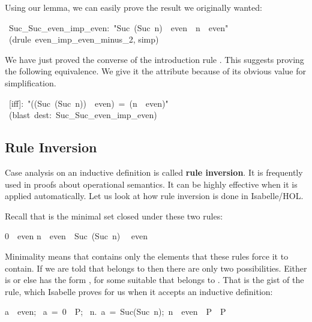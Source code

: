 \medskip
Using our lemma, we can easily prove the result we originally wanted:
\begin{isabelle}
\ Suc_Suc_even_imp_even:\ "Suc\ (Suc\ n)\ \isasymin \ even\ \isasymLongrightarrow \ n\ \isasymin \ even"\isanewline
{}\ (drule\ even_imp_even_minus_2, simp)
\end{isabelle}

We have just proved the converse of the introduction rule . 
This suggests proving the following equivalence.  We give it the
 attribute because of its obvious value for simplification.
\begin{isabelle}
\ [iff]:\ "((Suc\ (Suc\ n))\ \isasymin \ even)\ =\ (n\
\isasymin \ even)"\isanewline
{}\ (blast\ dest:\ Suc_Suc_even_imp_even)
\end{isabelle}


\subsection{Rule Inversion}\label{sec:rule-inversion}

%
Case analysis on an inductive definition is called \textbf{rule
inversion}.  It is frequently used in proofs about operational
semantics.  It can be highly effective when it is applied
automatically.  Let us look at how rule inversion is done in
Isabelle/HOL\@.

Recall that  is the minimal set closed under these two rules:
\begin{isabelle}
0\ \isasymin \ even\isanewline
n\ \isasymin \ even\ \isasymLongrightarrow \ Suc\ (Suc\ n)\ \isasymin
\ even
\end{isabelle}
Minimality means that  contains only the elements that these
rules force it to contain.  If we are told that 
belongs to
 then there are only two possibilities.  Either  is 
or else \isa{a} has the form \isa{Suc(Suc~n)}, for some suitable \isa{n}
that belongs to
.  That is the gist of the  rule, which Isabelle proves
for us when it accepts an inductive definition:
\begin{isabelle}
\isasymlbrakk a\ \isasymin \ even;\isanewline
\ a\ =\ 0\ \isasymLongrightarrow \ P;\isanewline
\ \isasymAnd n.\ \isasymlbrakk a\ =\ Suc(Suc\ n);\ n\ \isasymin \
even\isasymrbrakk \ \isasymLongrightarrow \ P\isasymrbrakk \
\isasymLongrightarrow \ P
\rulename{even.cases}
\end{isabelle}

